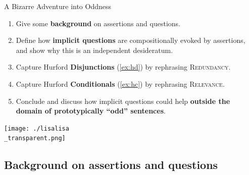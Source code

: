 \documentclass[10pt]{beamer}
\begin{document}
\begin{frame}{A Bizarre Adventure into Oddness}
	\begin{enumerate}
		\item Give some \textbf{background} on assertions and questions.\pause
		\item Define how \textbf{implicit questions} are compositionally evoked by assertions, and show why this is an independent desideratum.\pause
		\item Capture Hurford \textbf{Disjunctions} (\ref{ex:hd}) by rephrasing \textsc{Redundancy}.\pause
		\item Capture Hurford \textbf{Conditionals} (\ref{ex:hc}) by rephrasing \textsc{Relevance}.\pause
		\item Conclude and discuss how implicit questions could help \textbf{outside the domain of prototypically ``odd'' sentences}.
	\end{enumerate}
\end{frame}

\usebackgroundtemplate%
{%
	\texttt{[image: ./lisalisa\\\_transparent.png]}%
}
\begin{frame}
	\section[Background on assertions and questions]{Background on assertions and questions}
\end{frame}

\usebackgroundtemplate{}
\end{document}

